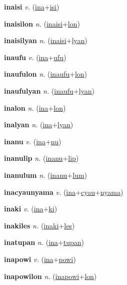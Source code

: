 \textbf{\hypertarget{inaisi}{inaisi}} \textit{v.} (\hyperlink{ina}{ina}+\allowbreak \hyperlink{isi}{isi})


\textbf{\hypertarget{inaisilon}{inaisilon}} \textit{n.} (\hyperlink{inaisi}{inaisi}+\allowbreak \hyperlink{lon}{lon})


\textbf{\hypertarget{inaisilyan}{inaisilyan}} \textit{n.} (\hyperlink{inaisi}{inaisi}+\allowbreak \hyperlink{lyan}{lyan})


\textbf{\hypertarget{inaufu}{inaufu}} \textit{v.} (\hyperlink{ina}{ina}+\allowbreak \hyperlink{ufu}{ufu})


\textbf{\hypertarget{inaufulon}{inaufulon}} \textit{n.} (\hyperlink{inaufu}{inaufu}+\allowbreak \hyperlink{lon}{lon})


\textbf{\hypertarget{inaufulyan}{inaufulyan}} \textit{n.} (\hyperlink{inaufu}{inaufu}+\allowbreak \hyperlink{lyan}{lyan})


\textbf{\hypertarget{inalon}{inalon}} \textit{n.} (\hyperlink{ina}{ina}+\allowbreak \hyperlink{lon}{lon})


\textbf{\hypertarget{inalyan}{inalyan}} \textit{n.} (\hyperlink{ina}{ina}+\allowbreak \hyperlink{lyan}{lyan})


\textbf{\hypertarget{inanu}{inanu}} \textit{v.} (\hyperlink{ina}{ina}+\allowbreak \hyperlink{nu}{nu})


\textbf{\hypertarget{inanulip}{inanulip}} \textit{n.} (\hyperlink{inanu}{inanu}+\allowbreak \hyperlink{lip}{lip})


\textbf{\hypertarget{inanulum}{inanulum}} \textit{n.} (\hyperlink{inanu}{inanu}+\allowbreak \hyperlink{lum}{lum})


\textbf{\hypertarget{inacyaunyama}{inacyaunyama}} \textit{v.} (\hyperlink{ina}{ina}+\allowbreak \hyperlink{cyau}{cyau}+\allowbreak \hyperlink{nyama}{nyama})


\textbf{\hypertarget{inaki}{inaki}} \textit{v.} (\hyperlink{ina}{ina}+\allowbreak \hyperlink{ki}{ki})


\textbf{\hypertarget{inakiles}{inakiles}} \textit{n.} (\hyperlink{inaki}{inaki}+\allowbreak \hyperlink{les}{les})


\textbf{\hypertarget{inatupan}{inatupan}} \textit{n.} (\hyperlink{ina}{ina}+\allowbreak \hyperlink{tupan}{tupan})


\textbf{\hypertarget{inapowi}{inapowi}} \textit{v.} (\hyperlink{ina}{ina}+\allowbreak \hyperlink{powi}{powi})


\textbf{\hypertarget{inapowilon}{inapowilon}} \textit{n.} (\hyperlink{inapowi}{inapowi}+\allowbreak \hyperlink{lon}{lon})


